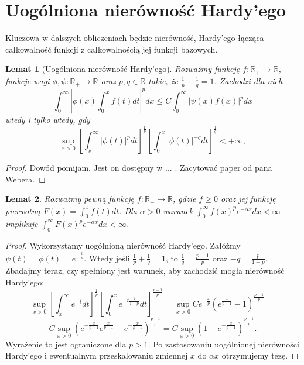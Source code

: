 \documentclass[licencjacka]{pracamgr}
\theoremstyle{definition}
\theoremstyle{definition}
\theoremstyle{plain}
\newtheorem{lemma}{Lemat}[section]
\theoremstyle{plain}
\theoremstyle{plain}
\begin{document}
\section{Uogólniona nierówność Hardy'ego}
Kluczowa w dalszych obliczeniach będzie nierówność, Hardy'ego łącząca całkowalność
funkcji z całkowalnością jej funkcji bazowych.

\begin{lemma}[Uogólniona nierówność Hardy'ego]\label{hardy}
    Rozważmy funkcję $f: \mathbb{R}_{+} \rightarrow \mathbb{R}$, funkcje-wagi
    $\phi, \psi: \mathbb{R}_{+} \rightarrow \mathbb{R}$ oraz $p, q \in
    \mathbb{R}$ takie, że $\frac{1}{p} + \frac{1}{q} = 1 $.  Zachodzi dla nich
\[
\int_0^\infty \left|
                \phi(x) \int_0^x f(t) dt
              \right|^p dx
\leq
C \int_0^\infty \left|
                    \psi(x)  f(x)
                \right|^p dx
\]
wtedy i tylko wtedy, gdy
\[
\sup_{x > 0}
\left[
\int_x^\infty  
   | \phi(t) |^p dt
\right]^{\frac{1}{p}}
\left[
\int_0^x
    | \phi(t) |^{-q} dt
\right]^{\frac{1}{q}} < + \infty,
\]
\end{lemma}
\begin{proof}
    Dowód pomijam. 
    Jest on dostępny w ... . Zacytować paper od pana Webera.
\end{proof}

\begin{lemma}
Rozważmy pewną funkcję $f: \mathbb{R}_{+} \rightarrow \mathbb{R}$, gdzie $f
\geq 0$ oraz jej funkcję pierwotną $F(x) = \int_0^{x} f(t) dt$. Dla $\alpha > 0$ warunek
$\int_0^\infty f(x)^p e^{-\alpha x}dx < \infty$ implikuje $\int_0^\infty
F(x)^pe^{- \alpha x}dx < \infty$.  \\
\end{lemma}
\begin{proof}
Wykorzystamy uogólnioną nierówność Hardy'ego.  Załóżmy $\psi(t) = \phi(t) =
e^{- \frac{t}{p} }$. Wtedy jeśli $\frac{1}{p} + \frac{1}{q} = 1 $, to
$\frac{1}{q} = \frac{p-1}{p}$ oraz $-q = \frac{p}{1-p}$.  Zbadajmy teraz, czy
spełniony jest warunek, aby zachodzić mogła nierówność Hardy'ego:
$$
\sup_{x > 0}
\left[
\int_x^\infty  
    e^{-t} dt
\right]^{\frac{1}{p}}
\left[
\int_0^x
    e^{-t \frac{1}{1-p}} dt
\right]^{\frac{p-1}{p}}
=
\sup_{x > 0}
    C
    e^{- \frac{x}{p}}
    \left(
        e^{\frac{x}{p-1}} - 1
    \right)^{\frac{p-1}{p}}
=
$$
$$
C
\sup_{x > 0}
    \left(
    e^{- \frac{x}{p-1}}
        e^{\frac{x}{p-1}} -
    e^{- \frac{x}{p-1}}
    \right)^{\frac{p-1}{p}}
=
C
\sup_{x > 0}
    \left(
        1 -
    e^{- \frac{x}{p-1}}
    \right)^{\frac{p-1}{p}}. 
$$
Wyrażenie to jest ograniczone dla $p> 1$. Po zastosowaniu uogólnionej
nierówności Hardy'ego i ewentualnym przeskalowaniu zmiennej $x$ do $\alpha x$
otrzymujemy tezę.
\end{proof}
\end{document}

